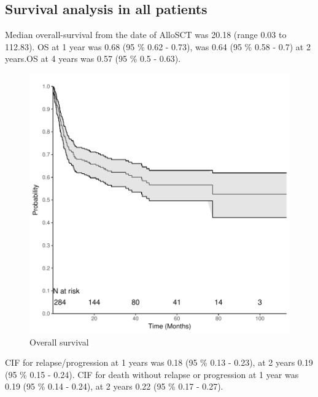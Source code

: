 \documentclass[a4paper,11pt] {article}
\begin{document}
\subsection{Survival analysis in all patients}
Median overall-survival from the date of AlloSCT was 20.18 (range 0.03 to 112.83). OS at 1 year was 0.68 (95 \% 0.62 - 0.73), was 0.64 (95 \% 0.58 - 0.7) at 2 years.OS at 4 years was 0.57 (95 \% 0.5 - 0.63).
\begin{figure}[h]
\begin{center}
\includegraphics{Rapport-fig1}
\end{center}
\caption{Overall survival}
\label{fig1}
\end{figure}

\pagebreak
CIF for relapse/progression at 1 years was 0.18 (95 \% 0.13 - 0.23), at 2 years  0.19 (95 \% 0.15 - 0.24).
CIF for death without relapse or progression at 1 year was 0.19 (95 \% 0.14 - 0.24), at 2 years  0.22 (95 \% 0.17 - 0.27). 
\end{document}
